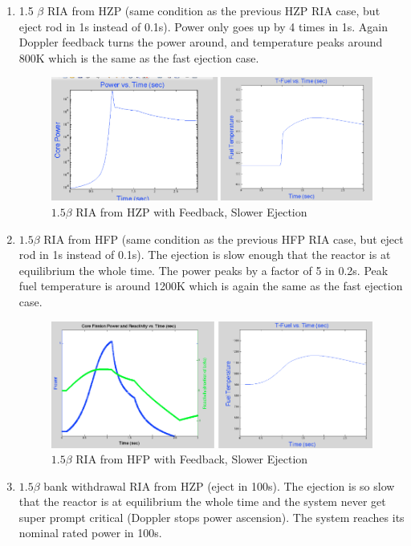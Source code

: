 \documentclass{school-22.211-notes}
\begin{document}
\begin{enumerate}
\clearpage
\item 1.5 $\beta$ RIA from HZP (same condition as the previous HZP RIA case, but eject rod in 1s instead of 0.1s). Power only goes up by 4 times in 1s. Again Doppler feedback turns the power around, and temperature peaks around 800K which is the same as  the fast ejection case. 

\begin{figure}[ht]
  \centering
  \includegraphics[width=6in]{images/pke/fn9.png}
  \caption{$1.5\beta$ RIA from HZP with Feedback, Slower Ejection}
\end{figure}


\item $1.5 \beta$ RIA from HFP (same condition as the previous HFP RIA case, but eject rod in 1s instead of 0.1s). The ejection is slow enough that the reactor is at equilibrium the whole time. The power peaks by a factor of 5 in 0.2s. Peak fuel temperature is around 1200K which is again the same as the fast ejection case. 

\begin{figure}[ht]
  \centering
  \includegraphics[width=6in]{images/pke/fn10.png}
  \caption{$1.5\beta$ RIA from HFP with Feedback, Slower Ejection}
\end{figure}

\clearpage
\item $1.5 \beta$ bank withdrawal RIA from HZP (eject in 100s). The ejection is so slow that the reactor is at equilibrium the whole time and the system never get super prompt critical (Doppler stops power ascension). The system reaches its nominal rated power in 100s. 


\end{enumerate}
\end{document}

